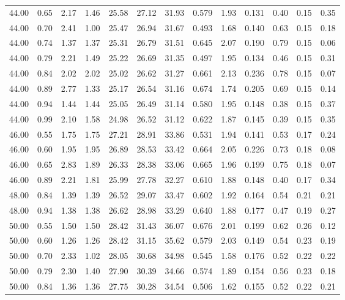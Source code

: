 \begin{longtable}{lc|cccc|cc|cc|ccc}
44.00 & 0.65 & 2.17 & 1.46 & 25.58 & 27.12 & 31.93 & 0.579 & 1.93 & 0.131 & 0.40 & 0.15 & 0.35\\
44.00 & 0.70 & 2.41 & 1.00 & 25.47 & 26.94 & 31.67 & 0.493 & 1.68 & 0.140 & 0.63 & 0.15 & 0.18\\
44.00 & 0.74 & 1.37 & 1.37 & 25.31 & 26.79 & 31.51 & 0.645 & 2.07 & 0.190 & 0.79 & 0.15 & 0.06\\
44.00 & 0.79 & 2.21 & 1.49 & 25.22 & 26.69 & 31.35 & 0.497 & 1.95 & 0.134 & 0.46 & 0.15 & 0.31\\
44.00 & 0.84 & 2.02 & 2.02 & 25.02 & 26.62 & 31.27 & 0.661 & 2.13 & 0.236 & 0.78 & 0.15 & 0.07\\
44.00 & 0.89 & 2.77 & 1.33 & 25.17 & 26.54 & 31.16 & 0.674 & 1.74 & 0.205 & 0.69 & 0.15 & 0.14\\
44.00 & 0.94 & 1.44 & 1.44 & 25.05 & 26.49 & 31.14 & 0.580 & 1.95 & 0.148 & 0.38 & 0.15 & 0.37\\
44.00 & 0.99 & 2.10 & 1.58 & 24.98 & 26.52 & 31.12 & 0.622 & 1.87 & 0.145 & 0.39 & 0.15 & 0.35\\
\hline
46.00 & 0.55 & 1.75 & 1.75 & 27.21 & 28.91 & 33.86 & 0.531 & 1.94 & 0.141 & 0.53 & 0.17 & 0.24\\
46.00 & 0.60 & 1.95 & 1.95 & 26.89 & 28.53 & 33.42 & 0.664 & 2.05 & 0.226 & 0.73 & 0.18 & 0.08\\
46.00 & 0.65 & 2.83 & 1.89 & 26.33 & 28.38 & 33.06 & 0.665 & 1.96 & 0.199 & 0.75 & 0.18 & 0.07\\
46.00 & 0.89 & 2.21 & 1.81 & 25.99 & 27.78 & 32.27 & 0.610 & 1.88 & 0.148 & 0.40 & 0.17 & 0.34\\
\hline
48.00 & 0.84 & 1.39 & 1.39 & 26.52 & 29.07 & 33.47 & 0.602 & 1.92 & 0.164 & 0.54 & 0.21 & 0.21\\
48.00 & 0.94 & 1.38 & 1.38 & 26.62 & 28.98 & 33.29 & 0.640 & 1.88 & 0.177 & 0.47 & 0.19 & 0.27\\
\hline
50.00 & 0.55 & 1.50 & 1.50 & 28.42 & 31.43 & 36.07 & 0.676 & 2.01 & 0.199 & 0.62 & 0.26 & 0.12\\
50.00 & 0.60 & 1.26 & 1.26 & 28.42 & 31.15 & 35.62 & 0.579 & 2.03 & 0.149 & 0.54 & 0.23 & 0.19\\
50.00 & 0.70 & 2.33 & 1.02 & 28.05 & 30.68 & 34.98 & 0.545 & 1.58 & 0.176 & 0.52 & 0.22 & 0.22\\
50.00 & 0.79 & 2.30 & 1.40 & 27.90 & 30.39 & 34.66 & 0.574 & 1.89 & 0.154 & 0.56 & 0.23 & 0.18\\
50.00 & 0.84 & 1.36 & 1.36 & 27.75 & 30.28 & 34.54 & 0.506 & 1.62 & 0.155 & 0.52 & 0.22 & 0.21\\

\end{longtable}
